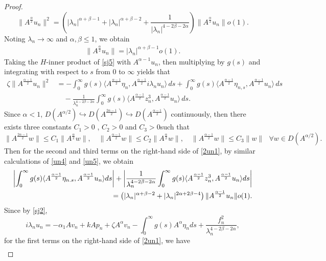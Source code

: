 \documentclass[12pt,reqno]{article}
\begin{document}
\begin{proof}
\[\|A^{\frac{\alpha}{2}}u_n\|^2=\left( |\lambda_n|^{\alpha + \beta - 1} +|\lambda_n|^{\alpha+\beta-2} +\frac{1}{|\lambda_n|^{4-2\beta-2\alpha}}\right)\| A^{\frac{\alpha}{2}} u_n \| o(1).\]
Noting $\lambda_n\to\infty$ and $\alpha,\beta\le1$, we obtain
		\begin{align}\label{un6}
			\| A^{\frac{\alpha}{2}} u_n \| = |\lambda_n|^{\alpha + \beta - 1} o(1).
		\end{align}
	Taking the $H$-inner product of \eqref{sj5} with $A^{\alpha-1}u_n$, then multiplying by $g(s)$ and integrating with respect to $s$ from $0$ to $\infty$ yields that
		\begin{align}\label{2un1}
			\zeta \| A^{\frac{\alpha-1}{2}} u_n \|^2
			&= -\int_0^\infty  g(s) \langle A^{\frac{\alpha-1}{2}} \eta_n, A^{\frac{\alpha-1}{2}}i \lambda_n u_n \rangle \, ds
			+ \int_0^\infty g(s) \langle A^{\frac{\alpha-1}{2}} \eta_{n,s}, A^{\frac{\alpha-1}{2}} u_n \rangle \, ds \nonumber \\
			&\quad - \frac{1}{\lambda_n^{4-2\beta-2\alpha}} \int_0^\infty g(s) \langle A^{\frac{\alpha-1}{2}} z_n^3, A^{\frac{\alpha-1}{2}} u_n \rangle \, ds.
		\end{align}
Since $\alpha<1$, $ D(A^{{\alpha}/{2}})\hookrightarrow D(A^{\frac{2\alpha-1}{2}})\hookrightarrow D(A^{\frac{\alpha-1}{2}})$ continuously, then there exists three  constants \( C_1 >0\) , \( C_2>0 \)  and $C_3>0$such that
		\[\|A^{\frac{2\alpha-1}{2}}w\| \le C_1\|A^{\frac{\alpha}{2}}w\|,\quad
		\|A^{\frac{\alpha-1}{2}}w\| \le C_2\|A^{\frac{\alpha}{2}}w\|,\quad
		\|A^{\frac{\alpha-1}{2}}w\| \le C_3\|w\|~~~\forall w\in D(A^{{\alpha}/{2}}).\]
		Then for the second and third terms on the right-hand side of \eqref{2un1}, by similar calculations of \eqref{un4} and \eqref{un5}, we obtain
		\begin{align}\label{2un2}
			\left|\int_0^\infty g(s)\langle A^{\frac{\alpha-1}{2}}\eta_{n.s}, A^{\frac{\alpha-1}{2}}u_n\rangle ds\right| +\left| \frac{1}{\lambda_n^{4-2\beta-2\alpha}}\int_0^\infty g(s)\langle A^{\frac{\alpha-1}{2}}z_n^3, A^{\frac{\alpha-1}{2}}u_n\rangle ds\right|\notag\\
=\left(|\lambda_n|^{\alpha +\beta -2}+|\lambda_n|^{2\alpha +2\beta -4}\right)\|A^{\frac{\alpha-1}{2}}u_n\|o(1).
		\end{align}
Since by \eqref{sj2},
		\[i\lambda_n u_n = -\alpha_1 A v_n + k A p_n + \zeta A^\alpha v_n - \int_0^\infty g(s) A^\alpha \eta_n ds + \frac{f_n^2}{\lambda_n^{4-2\beta-2\alpha}},\]
for the first terms on the right-hand side of \eqref{2un1}, we have
		\begin{align*}

\end{align*}
\end{proof}
\end{document}

